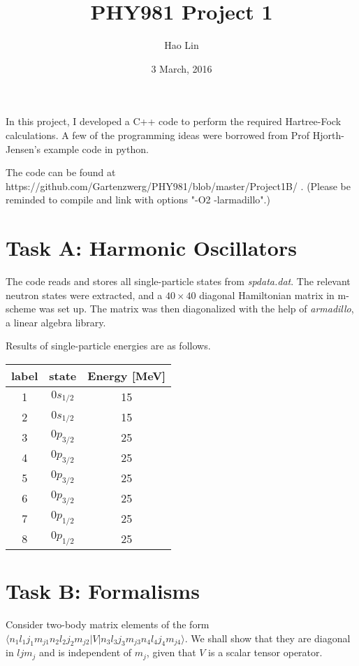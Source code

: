 \documentclass[11pt, oneside]{article}   	%
\title{PHY981 Project 1}
\author{Hao Lin}
\date{3 March, 2016}							%
\begin{document}
\maketitle

In this project, I developed a C++ code to perform the required Hartree-Fock calculations. A few of the programming ideas were borrowed from Prof Hjorth-Jensen's example code in python. 

The code can be found at https://github.com/Gartenzwerg/PHY981/blob/master/Project1B/ . (Please be reminded to compile and link with options "-O2 -larmadillo".)

\section{Task A: Harmonic Oscillators}
The code reads and stores all single-particle states from \textit{spdata.dat}. The relevant neutron states were extracted, and a $40\times40$ diagonal Hamiltonian matrix in m-scheme was set up. The matrix was then diagonalized with the help of \textit{armadillo}, a linear algebra library. 

Results of single-particle energies are as follows.
\begin{table}[H]
  \centering
\begin{tabular}{ccc}
  \toprule
	label & state &Energy [MeV] \\
  \midrule
	1 & $0s_{1/2}$ & 15 \\
	2 & $0s_{1/2}$ & 15 \\
	3 & $0p_{3/2}$ & 25 \\
	4 & $0p_{3/2}$ & 25 \\
	5 & $0p_{3/2}$ & 25 \\
	6 & $0p_{3/2}$ & 25 \\
	7 & $0p_{1/2}$ & 25 \\
	8 & $0p_{1/2}$ & 25 \\
    \bottomrule
  \end{tabular}
\end{table}

\section{Task B: Formalisms}
Consider two-body matrix elements of the form $\langle n_1 l_1 j_1 m_{j1} n_2 l_2 j_2 m_{j2}|V|n_3 l_3 j_3 m_{j3} n_4 l_4 j_4 m_{j4}\rangle$. We shall show that they are diagonal in $ljm_j$ and is independent of $m_j$, given that $V$ is a scalar tensor operator.
\end{document}
